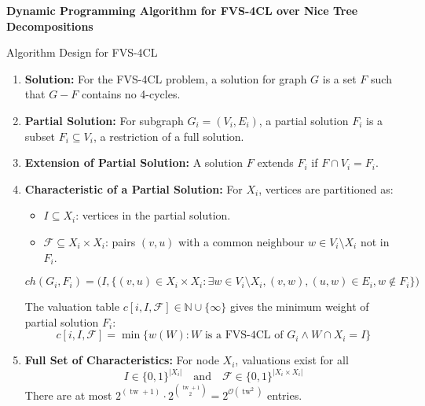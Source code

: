 \documentclass{beamer}
\newcommand{\tw}{\operatorname{tw}}
\begin{document}
\begin{frame}
  \centering
  \vfill
  \LARGE \textbf{Dynamic Programming Algorithm for FVS-4CL over Nice Tree Decompositions}
  \vfill
\end{frame}

\begin{frame}{Algorithm Design for FVS-4CL}
  \label{alg:dp}
\footnotesize
\begin{enumerate}
    \item \textbf{Solution:} For the FVS-4CL problem, a solution for graph \(G\) is a set \(F\) such that \(G - F\) contains no 4-cycles.

    \item \textbf{Partial Solution:} For subgraph \(G_i = (V_i, E_i)\), a partial solution \(F_i\) is a subset \(F_i \subseteq V_i\), a restriction of a full solution.

    \item \textbf{Extension of Partial Solution:} A solution \(F\) extends \(F_i\) if \(F \cap V_i = F_i\).

    \item \textbf{Characteristic of a Partial Solution:} For \(X_i\), vertices are partitioned as:
    \begin{itemize}
        \item \(I \subseteq X_i\): vertices in the partial solution.
        \item \(\mathcal{F} \subseteq X_i \times X_i\): pairs \((v,u)\) with a common neighbour \(w \in V_i \setminus X_i\) not in \(F_i\).
    \end{itemize}
    \[
    ch(G_i, F_i) = \big(I, \{(v,u) \in X_i \times X_i : \exists w \in V_i \setminus X_i, (v,w), (u,w) \in E_i, w \notin F_i \}\big)
    \]

    The valuation table \(c[i, I, \mathcal{F}] \in \mathbb{N} \cup \{\infty\}\) gives the minimum weight of partial solution \(F_i\):
    \[
    c[i, I, \mathcal{F}] = \min \{ w(W) : W \text{ is a FVS-4CL of } G_i \land W \cap X_i = I \}
    \]

    \item \textbf{Full Set of Characteristics:} For node \(X_i\), valuations exist for all
    \[
    I \in \{0,1\}^{|X_i|} \quad \text{and} \quad \mathcal{F} \in \{0,1\}^{|X_i \times X_i|}
    \]
    There are at most \(2^{(\tw+1)} \cdot 2^{\binom{\tw+1}{2}} = 2^{\mathcal{O}(\tw^2)}\) entries.
\end{enumerate}

\end{frame}
\end{document}

